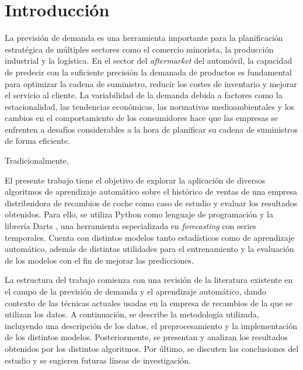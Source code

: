 \chapter{Introducción}\label{cap1}

La previsión de demanda es una herramienta importante para la planificación estratégica de múltiples sectores como el comercio minorista, la producción industrial y la logística. En el sector del \textit{aftermarket} del automóvil, la capacidad de predecir con la suficiente precisión la demanada de productos es fundamental para optimizar la cadena de suministro, reducir los costes de inventario y mejorar el servicio al cliente. La variabilidad de la demanda debida a factores como la estacionalidad, las tendencias económicas, las normativas medioambientales y los cambios en el comportamiento de los consumidores hace que las empresas se enfrenten a desafíos considerables a la hora de planificar su cadena de suministros de forma eficiente.

Tradicionalmente, 

El presente trabajo tiene el objetivo de explorar la aplicación de diversos algoritmos de aprendizaje automático sobre el histórico de ventas de una empresa distribuidora de recambios de coche como caso de estudio y evaluar los resultados obtenidos. Para ello, se utiliza Python \cite*{python} como lenguaje de programación y la librería Darts \cite*{darts}, una herramienta especializada en \textit{forecasting} con series temporales. Cuenta con distintos modelos tanto estadísticos como de aprendizaje automático, además de distintas utilidades para el entrenamiento y la evaluación de los modelos con el fin de mejorar las predicciones.

La estructura del trabajo comienza con una revisión de la literatura existente en el campo de la previsión de demanda y el aprendizaje automático, dando contexto de las técnicas actuales usadas en la empresa de recambios de la que se utilizan los datos. A continuación, se describe la metodología utilizada, incluyendo una descripción de los datos, el preprocesamiento y la implementación de los distintos modelos. Posteriormente, se presentan y analizan los resultados obtenidos por los distintos algoritmos. Por último, se discuten las conclusiones del estudio y se sugieren futuras líneas de investigación.







